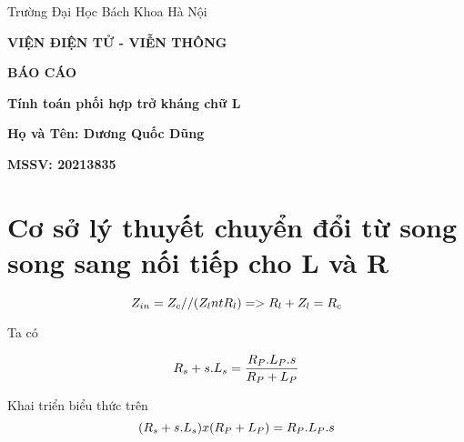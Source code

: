 \documentclass{article}
\begin{document}
\begin{titlepage}
    \centering
    \vspace{0.5cm}

    \LARGE
    Trường Đại Học Bách Khoa Hà Nội

    \LARGE
    \textbf{VIỆN ĐIỆN TỬ - VIỄN THÔNG}
    


    \vspace{1cm}

    \textbf{BÁO CÁO}

    \vspace{0.2cm}
    \LARGE
    \textbf{\fontsize{19}{24}\selectfont Tính toán phối hợp trở kháng chữ L}

    \vspace{0.2cm}
    \LARGE

    \begin{center}
        
    
    \textbf{Họ và Tên: Dương Quốc Dũng}
    
    \textbf{MSSV: 20213835}
    
    \end{center}
    
   

\end{titlepage}



\tableofcontents
\listoffigures
\newpage






\section{Cơ sở lý thuyết chuyển đổi từ song song sang nối tiếp cho L và R}

\begin{equation}
\Large
       Z_{in} = Z_{c} // (Z_{l} nt R_{l}) => R_{l}+Z_{l} = R_{c}
\end{equation}

Ta có 

\begin{equation}
\Large
       R_{s} + s.L_{s} = \frac{R_{P}.L_{P}.s }{R_{P}+L_{P}}
\end{equation}

Khai triển biểu thức trên 
\begin{equation}
\Large
       (R_{s} + s.L_{s}) x (R_{P}+L_{P}) = R_{P}.L_{P}.s 
\end{equation}
\end{document}

